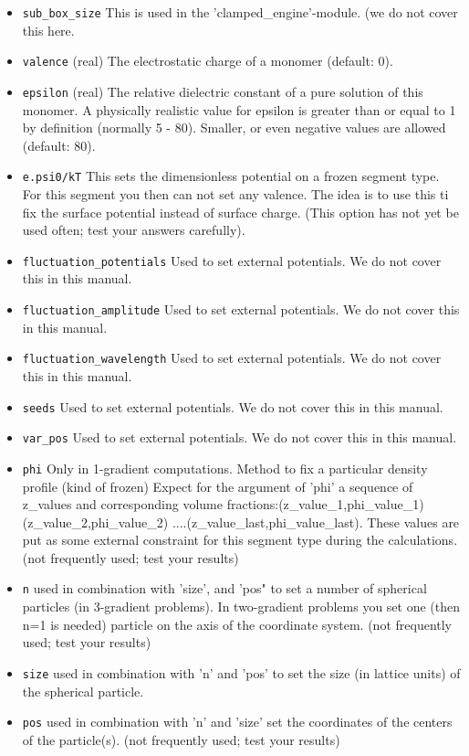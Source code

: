 \documentclass{article}
\begin{document}
\begin{itemize}
\item{\tt sub\_box\_size} This is used in the 'clamped_engine'-module. (we do not cover this here.

\item {\tt valence} (real) The electrostatic charge of a monomer (default: 0). 

\item {\tt epsilon} (real) The relative dielectric constant of a pure solution of this monomer.  A physically realistic value for epsilon is greater than or equal to 1 by definition (normally 5 - 80).  Smaller, or even negative values are allowed (default: 80).

\item {\tt e.psi0/kT} This sets the dimensionless potential on a frozen segment type. For this segment you then can not set any valence. The idea is to use this ti fix the surface potential instead of surface charge. (This option has not yet be used often; test your answers carefully).

\item{\tt fluctuation\_potentials} Used to set external potentials. We do not cover this in this manual.
\item{\tt fluctuation\_amplitude} Used to set external potentials. We do not cover this in this manual.
\item{\tt fluctuation\_wavelength} Used to set external potentials. We do not cover this in this manual.
\item{\tt seeds} Used to set external potentials. We do not cover this in this manual.
\item{\tt var\_pos} Used to set external potentials. We do not cover this in this manual.

\item{\tt phi} Only in 1-gradient computations. Method to fix a particular density profile (kind of frozen) Expect for the argument of 'phi' a sequence of z\_values and corresponding volume fractions:(z\_value\_1,phi\_value\_1)(z\_value\_2,phi\_value\_2) ....(z\_value\_last,phi\_value\_last). These values are put as some external constraint for this segment type during the calculations. (not frequently used; test your results)
\item{\tt n} used in combination with 'size', and 'pos" to set a number of spherical particles (in 3-gradient problems). In two-gradient problems you set one (then n=1 is needed) particle on the axis of the coordinate system. (not frequently used; test your results)
\item{\tt size} used in combination with 'n' and 'pos' to set the size (in lattice units) of the spherical particle.
\item{\tt pos} used in combination with 'n' and 'size' set the coordinates of the centers of the particle(s). (not frequently used; test your results)
 

\end{itemize}
\end{document}
